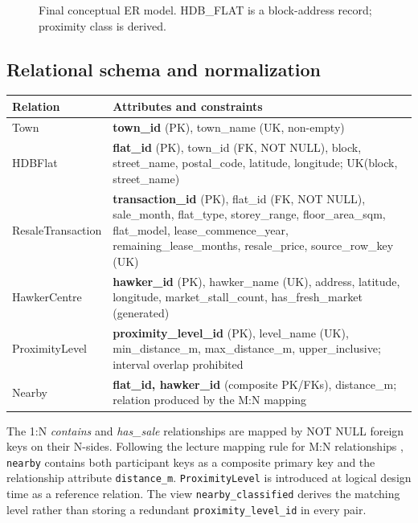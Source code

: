 \documentclass[11pt,a4paper]{article}
\begin{document}
\begin{figure}[p]
{}
\caption{Final conceptual ER model. HDB\_FLAT is a block-address record; proximity class is derived.}
\label{fig:er}
\end{figure}
\clearpage

\subsection{Relational schema and normalization}
\begin{longtable}{p{}p{}}
\toprule
Relation & Attributes and constraints \\
\midrule
\endhead
Town & \textbf{town\_id} (PK), town\_name (UK, non-empty) \\
HDBFlat & \textbf{flat\_id} (PK), town\_id (FK, NOT NULL), block, street\_name,
postal\_code, latitude, longitude; UK(block, street\_name) \\
ResaleTransaction & \textbf{transaction\_id} (PK), flat\_id (FK, NOT NULL), sale\_month,
flat\_type, storey\_range, floor\_area\_sqm, flat\_model,
lease\_commence\_year, remaining\_lease\_months, resale\_price, source\_row\_key (UK) \\
HawkerCentre & \textbf{hawker\_id} (PK), hawker\_name (UK), address, latitude,
longitude, market\_stall\_count, has\_fresh\_market (generated) \\
ProximityLevel & \textbf{proximity\_level\_id} (PK), level\_name (UK), min\_distance\_m,
max\_distance\_m, upper\_inclusive; interval overlap prohibited \\
Nearby & \textbf{flat\_id, hawker\_id} (composite PK/FKs),
distance\_m; relation produced by the M:N mapping \\
\bottomrule
\end{longtable}
The 1:N \emph{contains} and \emph{has\_sale} relationships are mapped by NOT NULL foreign
keys on their N-sides. Following the lecture mapping rule for M:N relationships
\citep{ntu2026relational},
\texttt{nearby} contains both participant keys as a composite primary key
and the relationship attribute \texttt{distance\_m}. \texttt{ProximityLevel} is introduced
at logical design time as a reference relation. The view
\texttt{nearby\_classified} derives the matching level rather than storing a
redundant \texttt{proximity\_level\_id} in every pair.
\end{document}
